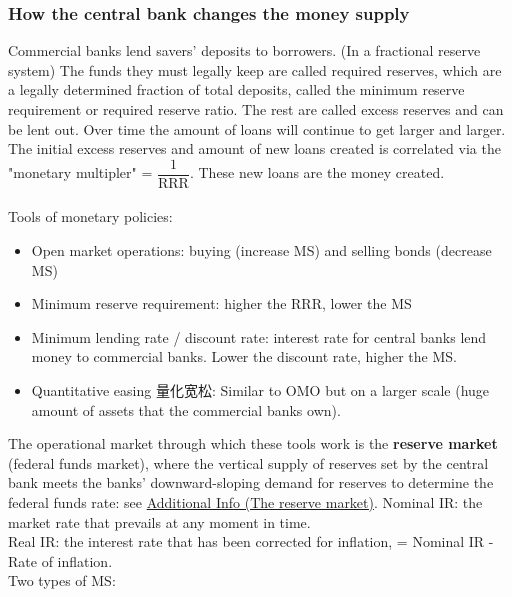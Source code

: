 \documentclass[a4paper,12pt]{article}
\begin{document}
\subsubsection*{How the central bank changes the money supply}
Commercial banks lend savers' deposits to borrowers. (In a fractional reserve system) The funds they must legally keep are called required reserves, which are a legally determined fraction of total deposits, called the minimum reserve requirement or required reserve ratio. The rest are called excess reserves and can be lent out. Over time the amount of loans will continue to get larger and larger. The initial excess reserves and amount of new loans created is correlated via the "monetary multipler" = $\dfrac{1}{\text{RRR}}$. These new loans are the money created.\\\\
Tools of monetary policies:
\begin{itemize}
  \item Open market operations: buying (increase MS) and selling bonds (decrease MS)
  \item Minimum reserve requirement: higher the RRR, lower the MS
  \item Minimum lending rate / discount rate: interest rate for central banks lend money to commercial banks. Lower the discount rate, higher the MS.
  \item Quantitative easing 量化宽松: Similar to OMO but on a larger scale (huge amount of assets that the commercial banks own). 
\end{itemize}
The operational market through which these tools work is the \textbf{reserve market} (federal funds market), where the vertical supply of reserves set by the central bank meets the banks' downward-sloping demand for reserves to determine the federal funds rate: see \hyperref[sec:add-reserve-market]{Additional Info (The reserve market)}.
Nominal IR: the market rate that prevails at any moment in time.\\
Real IR: the interest rate that has been corrected for inflation, = Nominal IR - Rate of inflation.\\
Two types of MS:
\end{document}
